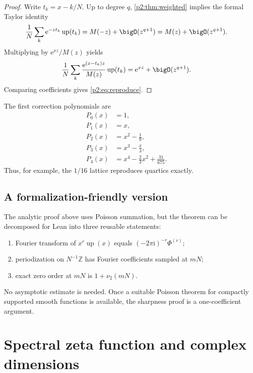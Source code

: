 \documentclass[11pt]{article}
\numberwithin{equation}{section}
\theoremstyle{definition}
\theoremstyle{remark}
\newcommand{\Z}{\mathbb Z}
\newcommand{\Up}{\operatorname{up}}
\newcommand{\e}{\mathrm e}
\newcommand{\ii}{\mathrm i}
\begin{document}
\begin{proof}
Write $t_k=x-k/N$.  Up to degree $q$, \cref{p2:thm:weighted} implies the formal
Taylor identity
\[
 \frac1N\sum_k\e^{-zt_k}\Up(t_k)=M(-z)+\bigO(z^{q+1})
 =M(z)+\bigO(z^{q+1}).
\]
Multiplying by $\e^{xz}/M(z)$ yields
\[
 \frac1N\sum_k\frac{\e^{(x-t_k)z}}{M(z)}\Up(t_k)
 =\e^{xz}+\bigO(z^{q+1}).
\]
Comparing coefficients gives \eqref{p2:eq:reproduce}.
\end{proof}

The first correction polynomials are
\begin{align}
 P_0(x)&=1,\nonumber\\
 P_1(x)&=x,\nonumber\\
 P_2(x)&=x^2-\frac19,\nonumber\\
 P_3(x)&=x^3-\frac{x}{3},\nonumber\\
 P_4(x)&=x^4-\frac23x^2+\frac{31}{675}.                   \label{p2:eq:P-first}
\end{align}
Thus, for example, the $1/16$ lattice reproduces quartics exactly.

\subsection{A formalization-friendly version}

The analytic proof above uses Poisson summation, but the theorem can be decomposed
for Lean into three reusable statements:
\begin{enumerate}
\item Fourier transform of $x^r\Up(x)$ equals
      $(-2\pi\ii)^{-r}\Phi^{(r)}$;
\item periodization on $N^{-1}\Z$ has Fourier coefficients sampled at $mN$;
\item exact zero order at $mN$ is $1+\nu_2(mN)$.
\end{enumerate}
No asymptotic estimate is needed.  Once a suitable Poisson theorem for compactly
supported smooth functions is available, the sharpness proof is a one-coefficient
argument.

\section{Spectral zeta function and complex dimensions}
\label{p2:sec:zeta}
\end{document}
